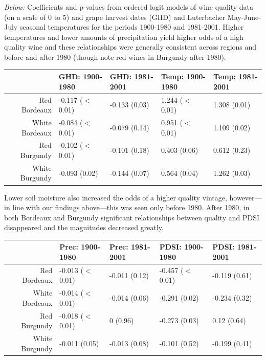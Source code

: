 \documentclass[portrait,a0,final] {a0poster} %
\begin{document}
\begin{multicols}{2}
\emph{Below:} Coefficients and p-values from ordered logit models of wine quality data (on a scale of 0 to 5) and grape harvest dates (GHD) and Luterbacher May-June-July seasonal temperatures for the periods 1900-1980 and 1981-2001. Higher temperatures and lower amounts of precipitation yield higher odds of a high quality wine and these relationships were generally consistent across regions and before and after 1980 (though note red wines in Burgundy after 1980). 
\begin{center}
\begin{tabular}{||r||l|l||l|l||}
  \hline
 & GHD: 1900-1980 & GHD: 1981-2001 & Temp: 1900-1980 & Temp: 1981-2001 \\ 
  \hline
Red Bordeaux & -0.117 ($<$0.01) & -0.133 (0.03) & 1.244 ($<$0.01) & 1.308 (0.01) \\ 
  White Bordeaux & -0.084 ($<$0.01) & -0.079 (0.14) & 0.951 ($<$0.01) & 1.109 (0.02) \\ 
  Red Burgundy & -0.102 ($<$0.01) & -0.101 (0.18) & 0.403 (0.06) & 0.612 (0.23) \\ 
  White Burgundy & -0.093 (0.02) & -0.144 (0.07) & 0.564 (0.04) & 1.262 (0.03) \\ 
   \hline
\end{tabular}
\end{center}
Lower soil moisture also increased the odds of a higher quality vintage, however---in line with our findings above---this was seen only before 1980. After 1980, in both Bordeaux and Burgundy significant relationships between quality and PDSI disappeared and the magnitudes decreased greatly.
\begin{center}
\begin{tabular}{||r||l|l||l|l||}
  \hline
 & Prec: 1900-1980 & Prec: 1981-2001 & PDSI: 1900-1980 & PDSI: 1981-2001 \\ 
  \hline
Red Bordeaux & -0.013 ($<$0.01) & -0.011 (0.12) & -0.457 ($<$0.01) & -0.119 (0.61) \\ 
  White Bordeaux & -0.014 ($<$0.01) & -0.014 (0.06) & -0.291 (0.02) & -0.234 (0.32) \\ 
  Red Burgundy & -0.018 ($<$0.01) & 0 (0.96) & -0.273 (0.03) & 0.12 (0.64) \\ 
  White Burgundy & -0.011 (0.05) & -0.013 (0.08) & -0.101 (0.52) & -0.199 (0.41) \\ 
   \hline
\end{tabular}
\end{center}


\end{multicols}
\end{document}
